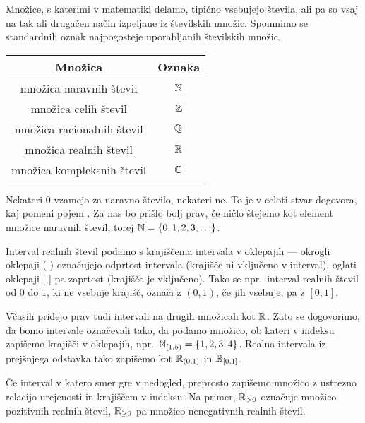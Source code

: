                 Množice, s katerimi v matematiki delamo, tipično vsebujejo števila, ali pa so vsaj na tak ali drugačen način izpeljane iz številskih množic. Spomnimo se standardnih oznak najpogosteje uporabljanih številskih množic.
                \begin{center}
                        \begin{tabular}{|cc|}
                                \hline
                                \textbf{Množica} & \textbf{Oznaka} \\
                                \hline
                                množica naravnih števil & $\mathbb{N}$ \\
                                množica celih števil & $\mathbb{Z}$ \\
                                množica racionalnih števil & $\mathbb{Q}$ \\
                                množica realnih števil & $\mathbb{R}$ \\
                                množica kompleksnih števil & $\mathbb{C}$ \\
                                \hline
                        \end{tabular}
                \end{center}

                Nekateri $0$ vzamejo za naravno število, nekateri ne. To je v celoti stvar dogovora, kaj pomeni pojem . Za nas bo prišlo bolj prav, če ničlo štejemo kot element množice naravnih števil, torej $\NN = \set{0, 1, 2, 3, \ldots}$.

                Interval realnih števil podamo s krajiščema intervala v oklepajih --- okrogli oklepaji ( ) označujejo odprtost intervala (krajišče ni vključeno v interval), oglati oklepaji [ ] pa zaprtost (krajišče je vključeno). Tako se npr.~interval realnih števil od $0$ do $1$, ki ne vsebuje krajišč, označi z $(0, 1)$, če jih vsebuje, pa z $[0, 1]$.

                Včasih pridejo prav tudi intervali na drugih množicah kot $\mathbb{R}$. Zato se dogovorimo, da bomo intervale označevali tako, da podamo množico, ob kateri v indeksu zapišemo krajišči v oklepajih, npr.~$\intco[\NN]{1}{5} = \set{1, 2, 3, 4}$. Realna intervala iz prejšnjega odstavka tako zapišemo kot ${\mathbb{R}}_{(0, 1)}$ in ${\mathbb{R}}_{[0, 1]}$.

                Če interval v katero smer gre v nedogled, preprosto zapišemo množico z ustrezno relacijo urejenosti in krajiščem v indeksu. Na primer, $\mathbb{R}_{> 0}$ označuje množico pozitivnih realnih števil, $\mathbb{R}_{\geq 0}$ pa množico nenegativnih realnih števil.

